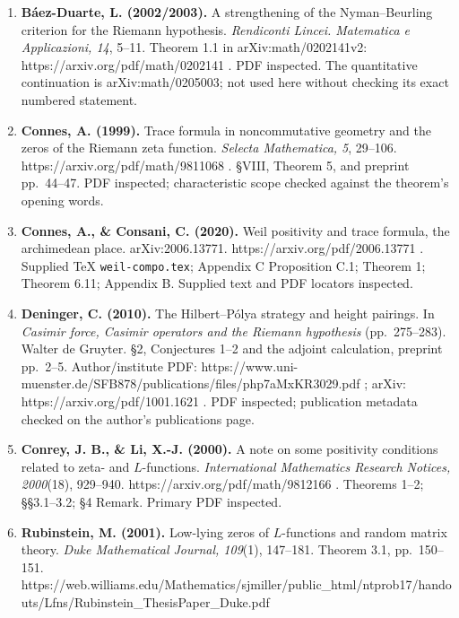 \begin{enumerate}
  p.~1702:
  https://www.numdam.org/article/AIF\_2007\_\_57\_5\_1689\_0.pdf . In
  arXiv v4 (2005), https://arxiv.org/pdf/math/0404394 , the
  corresponding statement is Theorem 2.2, p.~11. Both primary statements
  inspected; their different numbering is retained.
\item
  \textbf{Báez-Duarte, L. (2002/2003).} A strengthening of the
  Nyman--Beurling criterion for the Riemann hypothesis. \emph{Rendiconti
  Lincei. Matematica e Applicazioni, 14}, 5--11. Theorem 1.1 in
  arXiv:math/0202141v2: https://arxiv.org/pdf/math/0202141 . PDF
  inspected. The quantitative continuation is arXiv:math/0205003; not
  used here without checking its exact numbered statement.
\item
  \textbf{Connes, A. (1999).} Trace formula in noncommutative geometry
  and the zeros of the Riemann zeta function. \emph{Selecta Mathematica,
  5}, 29--106. https://arxiv.org/pdf/math/9811068 . §VIII, Theorem 5,
  and preprint pp.~44--47. PDF inspected; characteristic scope checked
  against the theorem's opening words.
\item
  \textbf{Connes, A., \& Consani, C. (2020).} Weil positivity and trace
  formula, the archimedean place. arXiv:2006.13771.
  https://arxiv.org/pdf/2006.13771 . Supplied TeX
  \texttt{weil-compo.tex}; Appendix C Proposition C.1; Theorem 1;
  Theorem 6.11; Appendix B. Supplied text and PDF locators inspected.
\item
  \textbf{Deninger, C. (2010).} The Hilbert--Pólya strategy and height
  pairings. In \emph{Casimir force, Casimir operators and the Riemann
  hypothesis} (pp.~275--283). Walter de Gruyter. §2, Conjectures 1--2
  and the adjoint calculation, preprint pp.~2--5. Author/institute PDF:
  https://www.uni-muenster.de/SFB878/publications/files/php7aMxKR3029.pdf
  ; arXiv: https://arxiv.org/pdf/1001.1621 . PDF inspected; publication
  metadata checked on the author's publications page.
\item
  \textbf{Conrey, J. B., \& Li, X.-J. (2000).} A note on some positivity
  conditions related to zeta- and \(L\)-functions. \emph{International
  Mathematics Research Notices, 2000}(18), 929--940.
  https://arxiv.org/pdf/math/9812166 . Theorems 1--2; §§3.1--3.2; §4
  Remark. Primary PDF inspected.
\item
  \textbf{Rubinstein, M. (2001).} Low-lying zeros of \(L\)-functions and
  random matrix theory. \emph{Duke Mathematical Journal, 109}(1),
  147--181. Theorem 3.1, pp.~150--151.
  https://web.williams.edu/Mathematics/sjmiller/public\_html/ntprob17/handouts/Lfns/Rubinstein\_ThesisPaper\_Duke.pdf

\end{enumerate}
